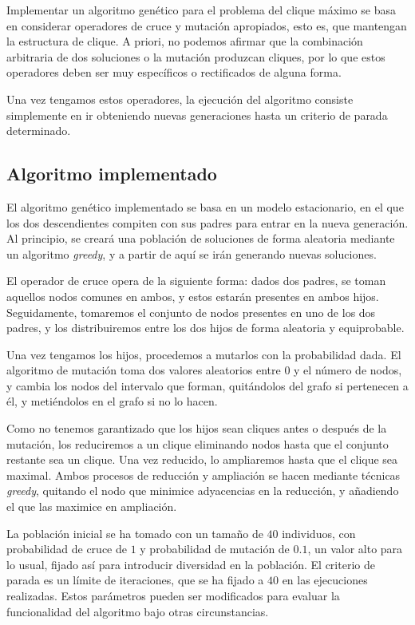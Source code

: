 Implementar un algoritmo genético para el problema del clique máximo se basa en
considerar operadores de cruce y mutación apropiados, esto es, que mantengan la
estructura de clique. A priori, no podemos afirmar que la combinación arbitraria
de dos soluciones o la mutación produzcan cliques, por lo que estos operadores
deben ser muy específicos o rectificados de alguna forma.

Una vez tengamos estos operadores, la ejecución del algoritmo consiste simplemente
en ir obteniendo nuevas generaciones hasta un criterio de parada determinado.

\subsection{Algoritmo implementado}

El algoritmo genético implementado se basa en un modelo estacionario, en el que
los dos descendientes compiten con sus padres para entrar en la nueva generación.
Al principio, se creará una población de soluciones de forma aleatoria mediante
un algoritmo \textit{greedy}, y a partir de aquí se irán generando nuevas soluciones.

El operador de cruce opera de la siguiente forma: dados dos padres, se toman aquellos
nodos comunes en ambos, y estos estarán presentes en ambos hijos. Seguidamente,
tomaremos el conjunto de nodos presentes en uno de los dos padres, y los distribuiremos
entre los dos hijos de forma aleatoria y equiprobable.

Una vez tengamos los hijos, procedemos a mutarlos con la probabilidad dada. El
algoritmo de mutación toma dos valores aleatorios entre $0$ y el número de nodos,
y cambia los nodos del intervalo que forman, quitándolos del grafo si pertenecen
a él, y metiéndolos en el grafo si no lo hacen.

Como no tenemos garantizado que los hijos sean cliques antes o después de la mutación,
los reduciremos a un clique eliminando nodos hasta que el conjunto restante sea un
clique. Una vez reducido, lo ampliaremos hasta que el clique sea maximal.
Ambos procesos de reducción y ampliación se hacen mediante técnicas \textit{greedy},
quitando el nodo que minimice adyacencias en la reducción, y añadiendo el que las
maximice en ampliación.

La población inicial se ha tomado con un tamaño de $40$ individuos, con probabilidad
de cruce de $1$ y probabilidad de mutación de $0.1$, un valor alto para lo usual,
fijado así para introducir diversidad en la población. El criterio de parada es un
límite de iteraciones, que se ha fijado a $40$ en las ejecuciones realizadas.
Estos parámetros pueden ser modificados para evaluar la funcionalidad del algoritmo
bajo otras circunstancias.

